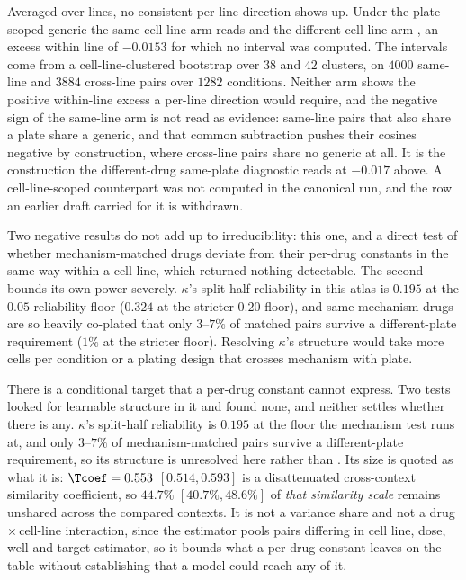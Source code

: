 Averaged over lines, no consistent per-line direction shows up. Under the
plate-scoped generic the same-cell-line arm reads 
and the different-cell-line arm , an excess within
line of $-0.0153$ for which no interval was computed. The intervals come from a
cell-line-clustered bootstrap over $\num{38}$ and $\num{42}$ clusters, on
$\num{4000}$ same-line and $\num{3884}$ cross-line pairs over $\num{1282}$
conditions. Neither arm shows the positive within-line excess a per-line
direction would require, and the negative sign of the same-line arm is not read
as evidence: same-line pairs that also share a plate share a generic, and that
common subtraction pushes their cosines negative by construction, where
cross-line pairs share no generic at all. It is the construction the
different-drug same-plate diagnostic reads at $-0.017$ above. A
cell-line-scoped counterpart was not computed in the canonical run, and the row
an earlier draft carried for it is withdrawn.

Two negative results do not add up to irreducibility: this one, and a direct
test of whether mechanism-matched drugs deviate from their per-drug constants in
the same way within a cell line, which returned nothing detectable. The second
bounds its own power severely. $\kappa$'s split-half reliability in this atlas is
$0.195$ at the $0.05$ reliability floor ($0.324$ at the stricter $0.20$ floor),
and same-mechanism drugs are so heavily co-plated that only $3$--$7\%$ of
matched pairs survive a different-plate requirement ($1\%$ at the stricter
floor). Resolving $\kappa$'s structure would take more cells per condition or a
plating design that crosses mechanism with plate.

\begin{claim}
There is a conditional target that a per-drug constant cannot express. Two tests
looked for learnable structure in it and found none, and neither settles whether
there is any. $\kappa$'s split-half reliability is $0.195$ at the floor the
mechanism test runs at, and only $3$--$7\%$ of mechanism-matched pairs survive a
different-plate requirement, so its structure is unresolved here rather than
\shownzero. Its size is quoted as what it is: $\Tcoef = 0.553$
\nolinebreak[3]$[0.514, 0.593]$ is a disattenuated cross-context similarity
coefficient, so $44.7\%$ $[40.7\%, 48.6\%]$ of \emph{that similarity scale}
remains unshared across the compared contexts. It is not a variance share and not
a drug\,$\times$\,cell-line interaction, since the estimator pools pairs
differing in cell line, dose, well and target estimator, so it bounds what a
per-drug constant leaves on the table without establishing that a model could
reach any of it.
\end{claim}

